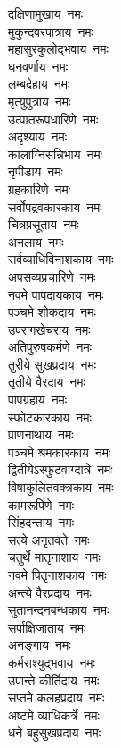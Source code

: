 \begin{flushleft}
\begin{multicols}{2}
दक्षिणामुखाय~नमः\\
मुकुन्दवरपात्राय~नमः\\
महासुरकुलोद्भवाय~नमः\\
घनवर्णाय~नमः\\
लम्बदेहाय~नमः\\
मृत्युपुत्राय~नमः\\
उत्पातरूपधारिणे~नमः\\
अदृश्याय~नमः\\
कालाग्निसन्निभाय~नमः\\
नृपीडाय~नमः\hfill{}\\
ग्रहकारिणे~नमः\\
सर्वोपद्रवकारकाय~नमः\\
चित्रप्रसूताय~नमः\\
अनलाय~नमः\\
सर्वव्याधिविनाशकाय~नमः\\
अपसव्यप्रचारिणे~नमः\\
नवमे पापदायकाय~नमः\\
पञ्चमे शोकदाय~नमः\\
उपरागखेचराय~नमः\\
अतिपुरुषकर्मणे~नमः\hfill{}\\
तुरीये सुखप्रदाय~नमः\\
तृतीये वैरदाय~नमः\\
पापग्रहाय~नमः\\
स्फोटकारकाय~नमः\\
प्राणनाथाय~नमः\\
पञ्चमे श्रमकारकाय~नमः\\
द्वितीयेऽस्फुटवाग्दात्रे~नमः\\
विषाकुलितवक्त्रकाय~नमः\\
कामरूपिणे~नमः\\
सिंहदन्ताय~नमः\hfill{}\\
सत्ये अनृतवते~नमः\\
चतुर्थे मातृनाशाय~नमः\\
नवमे पितृनाशकाय~नमः\\
अन्त्ये वैरप्रदाय~नमः\\
सुतानन्दनबन्धकाय~नमः\\
सर्पाक्षिजाताय~नमः\\
अनङ्गाय~नमः\\
कर्मराश्युद्भवाय~नमः\\
उपान्ते कीर्तिदाय~नमः\\
सप्तमे कलहप्रदाय~नमः\hfill{}\\
अष्टमे व्याधिकर्त्रे~नमः\\
धने बहुसुखप्रदाय~नमः\\

\end{multicols}
\end{flushleft}
